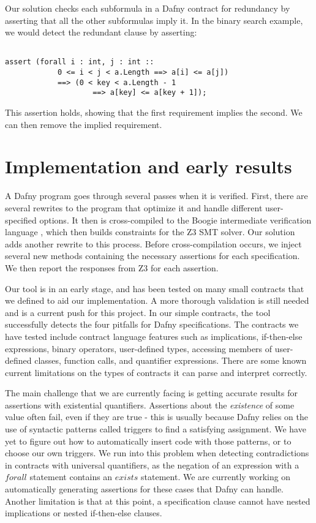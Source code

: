 \documentclass[sigplan,screen,anonymous]{acmart}
\begin{document}
Our solution checks each subformula in a Dafny contract for redundancy by asserting that all the
other subformulas imply it. In the binary search example, we would detect the redundant clause by
asserting:

\begin{lstlisting}[language=dafny]

assert (forall i : int, j : int ::
            0 <= i < j < a.Length ==> a[i] <= a[j])
            ==> (0 < key < a.Length - 1
                    ==> a[key] <= a[key + 1]);

\end{lstlisting}

This assertion holds, showing that the first requirement implies the second. We can then remove the
implied requirement.

\section{Implementation and early results}

A Dafny program goes through several passes when it is verified. First, there are several rewrites to the program that optimize it and handle different user-specified options. It then is cross-compiled to the Boogie intermediate verification language \cite{leino2008boogie}, which then builds constraints for the Z3 SMT solver. Our solution \cite{contractrepo} adds another rewrite to this process. Before cross-compilation occurs, we inject several new methods containing the necessary assertions for each specification. We then report the responses from Z3 for each assertion.

Our tool is in an early stage, and has been tested on many small contracts that we defined to aid our implementation. A more thorough validation is still needed and is a current push for this project. In our simple contracts, the tool successfully detects the four pitfalls for Dafny specifications. The contracts we have tested include contract language features such as  implications, if-then-else expressions, binary operators, user-defined types, accessing members of user-defined classes, function calls, and quantifier expressions. There are some known current limitations on the types of contracts it can parse and interpret correctly.

The main challenge that we are currently facing is getting accurate results for assertions with existential quantifiers. Assertions about the \emph{existence} of some value often fail, even if they are true - this is usually because Dafny relies on the use of syntactic patterns called triggers \cite{leino2016trigger} to find a satisfying assignment. We have yet to figure out how to automatically insert code with those patterns, or to choose our own triggers.  We run into this problem when detecting contradictions in contracts with universal quantifiers, as the negation of an expression with a $\mathit{forall}$ statement contains an $\mathit{exists}$ statement. We are currently working on automatically generating assertions for these cases that Dafny can handle. Another limitation is that at this point, a specification clause cannot have nested implications or nested if-then-else clauses.
\end{document}
